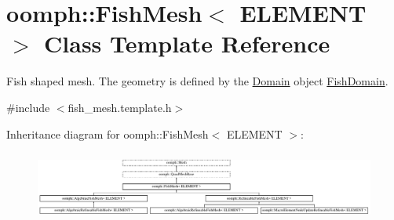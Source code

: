 \hypertarget{classoomph_1_1FishMesh}{}\section{oomph\+:\+:Fish\+Mesh$<$ E\+L\+E\+M\+E\+NT $>$ Class Template Reference}
\label{classoomph_1_1FishMesh}


Fish shaped mesh. The geometry is defined by the \hyperlink{classoomph_1_1Domain}{Domain} object \hyperlink{classoomph_1_1FishDomain}{Fish\+Domain}.  




{\ttfamily \#include $<$fish\+\_\+mesh.\+template.\+h$>$}

Inheritance diagram for oomph\+:\+:Fish\+Mesh$<$ E\+L\+E\+M\+E\+NT $>$\+:\begin{figure}[H]
\begin{center}
\leavevmode
\includegraphics[height=2.276423cm]{classoomph_1_1FishMesh}
\end{center}
\end{figure}
